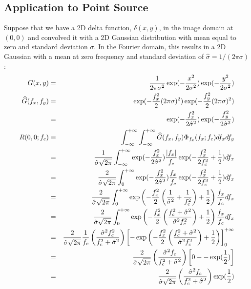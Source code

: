 \documentclass{article}
\DeclarePairedDelimiter\abs{\lvert}{\rvert}%
\begin{document}
\subsection{Application to Point Source}
Suppose that we have a 2D delta function, $ \delta(x,y) $, in the image domain at $ (0,0) $ and convolved it with a 2D Gaussian distribution with mean equal to zero and standard deviation $ \sigma $. In the Fourier domain, this results in a 2D Gaussian with a mean at zero frequency and standard deviation of $ \hat{\sigma} = 1/(2\pi\sigma) $:
\begin{eqnarray}
    G(x,y) & = & \frac{1}{2\pi\sigma^2} \exp(-\frac{x^2}{2\sigma^2})  \exp(-\frac{y^2}{2\sigma^2}) \\
    \widehat{G}(f_x,f_y) & = & \exp(-\frac{f_x^2}{2}(2\pi\sigma)^2)  \exp(-\frac{f_y^2}{2}(2\pi\sigma)^2)\\
    & = & \exp(-\frac{f_x^2}{2\hat{\sigma}^2})  \exp(-\frac{f_y^2}{2\hat{\sigma}^2}) \\
    R(0,0; f_c) & = & \int_{-\infty}^{+\infty} \int_{-\infty}^{+\infty} \widehat{G}(f_x,f_y) \Phi_{f_x}(f_x; f_c) df_x df_y \\
    & = & \frac{1}{\hat{\sigma}\sqrt{2\pi}} \int_{-\infty}^{+\infty} \exp(-\frac{f_x^2}{2\hat{\sigma}^2})  \frac{\abs {f_x}}{f_c} \exp(-\frac{f_x^2}{2f_c^2}+\frac{1}{2}) df_x  \\
    & = & \frac{2}{\hat{\sigma}\sqrt{2\pi}} \int_{0}^{+\infty} \exp(-\frac{f_x^2}{2\hat{\sigma}^2})  \frac{f_x}{f_c} \exp(-\frac{f_x^2}{2f_c^2}+\frac{1}{2}) df_x  \\
    & = & \frac{2}{\hat{\sigma}\sqrt{2\pi}} \int_{0}^{+\infty} \exp\left(-\frac{f_x^2}{2} \left(\frac{1}{\hat{\sigma}^2} +\frac{1}{f_c^2}\right)+\frac{1}{2}\right) \frac{f_x}{f_c} df_x \\
    & = & \frac{2}{\hat{\sigma}\sqrt{2\pi}} \int_{0}^{+\infty} \exp\left(-\frac{f_x^2}{2} \left( \frac{f_c^2+\hat{\sigma}^2}{\hat{\sigma}^2f_c^2} \right) +\frac{1}{2}\right) \frac{f_x}{f_c} df_x \\
    & = & \frac{2}{\hat{\sigma}\sqrt{2\pi}} \frac{1}{f_c} \left( \frac{\hat{\sigma}^2f_c^2}{f_c^2+\hat{\sigma}^2} \right) 
    \left[ -\exp\left(-\frac{f_x^2}{2} \left( \frac{f_c^2+\hat{\sigma}^2}{\hat{\sigma}^2f_c^2} \right) + \frac{1}{2} \right)  \right]_0^{+\infty} \\
    & = & \frac{2}{\hat{\sigma}\sqrt{2\pi}} \left( \frac{\hat{\sigma}^2f_c}{f_c^2+\hat{\sigma}^2} \right) 
    \left[ 0 - -\exp(\frac{1}{2}) \right] \\
    & = & \frac{2}{\hat{\sigma}\sqrt{2\pi}} \left( \frac{\hat{\sigma}^2f_c}{f_c^2+\hat{\sigma}^2} \right) \exp(\frac{1}{2})  \\

\end{eqnarray}
\end{document}
